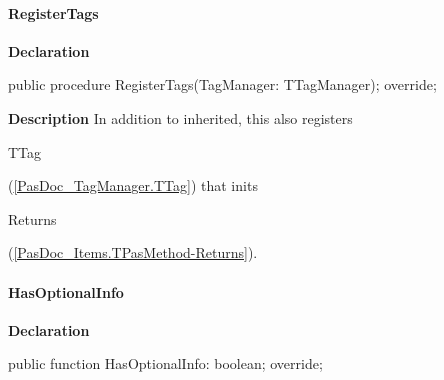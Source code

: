\documentclass{report}
\newif\ifpdf
\begin{document}
\paragraph*{RegisterTags}\hspace*{\fill}

\label{PasDoc_Items.TPasMethod-RegisterTags}
\begin{list}{}{
\setlength{\itemindent}{0cm}
\setlength{\listparindent}{0cm}
\setlength{\leftmargin}{\evensidemargin}
\addtolength{\leftmargin}{\tmplength}
\settowidth{\labelsep}{X}
\addtolength{\leftmargin}{\labelsep}
\setlength{\labelwidth}{\tmplength}
}
\item[\textbf{Declaration}\hfill]
\ifpdf
\begin{flushleft}
\fi
\begin{ttfamily}
public procedure RegisterTags(TagManager: TTagManager); override;\end{ttfamily}

\ifpdf
\end{flushleft}
\fi

\par
\item[\textbf{Description}]
In addition to inherited, this also registers \begin{ttfamily}TTag\end{ttfamily}(\ref{PasDoc_TagManager.TTag}) that inits \begin{ttfamily}Returns\end{ttfamily}(\ref{PasDoc_Items.TPasMethod-Returns}).

\end{list}
\paragraph*{HasOptionalInfo}\hspace*{\fill}

\label{PasDoc_Items.TPasMethod-HasOptionalInfo}
\begin{list}{}{
\setlength{\itemindent}{0cm}
\setlength{\listparindent}{0cm}
\setlength{\leftmargin}{\evensidemargin}
\addtolength{\leftmargin}{\tmplength}
\settowidth{\labelsep}{X}
\addtolength{\leftmargin}{\labelsep}
\setlength{\labelwidth}{\tmplength}
}
\item[\textbf{Declaration}\hfill]
\ifpdf
\begin{flushleft}
\fi
\begin{ttfamily}
public function HasOptionalInfo: boolean; override;\end{ttfamily}

\ifpdf
\end{flushleft}
\fi

\end{list}
\ifpdf
\end{document}
